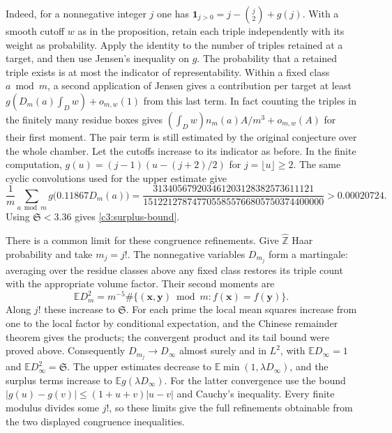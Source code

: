 \documentclass[11pt,letterpaper]{article}
\theoremstyle{definition}
\begin{document}
Indeed, for a nonnegative integer $j$ one has
$\mathbf1_{j>0}=j-\binom j2+g(j)$. With a smooth cutoff $w$ as in
the proposition, retain each triple independently with its weight
as probability. Apply the identity to the number of triples retained
at a target, and then use Jensen's inequality on $g$. The probability
that a retained triple exists is at most the indicator of representability.
Within a fixed class $a\bmod m$, a second application of Jensen gives
a contribution per target at least $g(D_m(a)\int_D w)+o_{m,w}(1)$
from this last term. In fact counting the triples in the finitely
many residue boxes gives $(\int_D w)n_m(a)A/m^3+o_{m,w}(A)$
for their first moment. The pair term is still estimated by the
original conjecture over the whole chamber. Let the cutoffs increase
to its indicator as before. In the finite computation,
$g(u)=(j-1)(u-(j+2)/2)$ for $j=\lfloor u\rfloor\ge2$.
The same cyclic convolutions used for the upper estimate give
\[
 \frac1m\sum_{a\bmod m}g\bigl(0.11867D_m(a)\bigr)
 =\frac{313405679203461203128382573611121}
        {1512212787477055855766805750374400000}
 >0.00020724 .
\]
Using $\mathfrak S<3.36$ gives \eqref{c3:surplus-bound}.

There is a common limit for these congruence refinements. Give
$\widehat{\mathbb Z}$ Haar probability and take $m_j=j!$.
The nonnegative variables $D_{m_j}$ form a martingale: averaging over
the residue classes above any fixed class restores its triple count
with the appropriate volume factor. Their second moments are
\[
 \mathbb E D_m^2=m^{-5}
 \#\{(\mathbf x,\mathbf y)\bmod m:f(\mathbf x)=f(\mathbf y)\}.
\]
Along $j!$ these increase to $\mathfrak S$. For each prime the
local mean squares increase from one to the local factor by conditional
expectation, and the Chinese remainder theorem gives the products;
the convergent product and its tail bound were proved above.
Consequently $D_{m_j}\to D_\infty$ almost surely and in $L^2$, with
$\mathbb E D_\infty=1$ and $\mathbb E D_\infty^2=\mathfrak S$.
The upper estimates decrease to
$\mathbb E\min(1,\lambda D_\infty)$, and the surplus terms
increase to $\mathbb E g(\lambda D_\infty)$.
For the latter convergence use the bound
$|g(u)-g(v)|\le(1+u+v)|u-v|$ and Cauchy's inequality.
Every finite modulus divides some $j!$, so these limits give
the full refinements obtainable from the two displayed congruence
inequalities.
\end{document}
